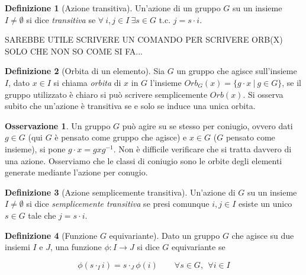 \documentclass[11pt]{article}
\theoremstyle{plain}
\theoremstyle{definition}
\newtheorem{defn}{Definizione}[section]
\newtheorem*{rem}{Osservazione}
\theoremstyle{remark}
\begin{document}
\begin{defn}[Azione transitiva]
Un'azione di un gruppo $G$ su un insieme $I\neq \emptyset$ si dice \textit{transitiva} se $\forall\ i,j\in I\ \exists s\in G$ t.c. $j=s\cdot i$.
\label{defn:azione transitiva}
\end{defn}

SAREBBE UTILE SCRIVERE UN COMANDO PER SCRIVERE ORB(X) SOLO CHE NON SO COME SI FA...
\begin{defn}[Orbita di un elemento]
Sia $G$ un gruppo che agisce sull'insieme $I$, dato $x\in I$ si chiama \textit{orbita} di $x$ in $G$ l'insieme $Orb_{G}(x)=\{ g\cdot x\ |\ g\in G \}$, se il gruppo utilizzato è chiaro si può scrivere semplicemente $Orb(x)$. Si osserva subito che un'azione è transitiva se e solo se induce una unica orbita.
\label{defn:orbita}
\end{defn}
\begin{rem}
	Un gruppo $G$ può agire su se stesso per coniugio, ovvero dati $g\in G$ (qui $G$ è pensato come gruppo che agisce) e $x\in G$ ($G$ pensato come insieme),
	si pone $g\cdot x = gxg^{-1}$. Non è difficile verificare che si tratta davvero di una azione.
	Osserviamo che le classi di coniugio sono le orbite degli elementi generate mediante l'azione per conugio.
\end{rem}




\begin{defn}[Azione semplicemente transitiva]
Un'azione di $G$ su un insieme $I\neq \emptyset$ si dice \textit{semplicemente transitiva}
se presi comunque $i,j\in I$ esiste un unico $s\in G$ tale che $j=s\cdot i$.
\end{defn}


\begin{defn}[Funzione $G$ equivariante]

Dato un gruppo $G$ che agisce su due insiemi $I$ e $J$, una funzione $\phi: I \to J$ si dice $G$ equivariante se 

\[ \phi(s \cdot_I i) = s \cdot_J \phi(i) \qquad \forall s \in G, \ \ \forall i \in I \]


\end{defn}
\end{document}
